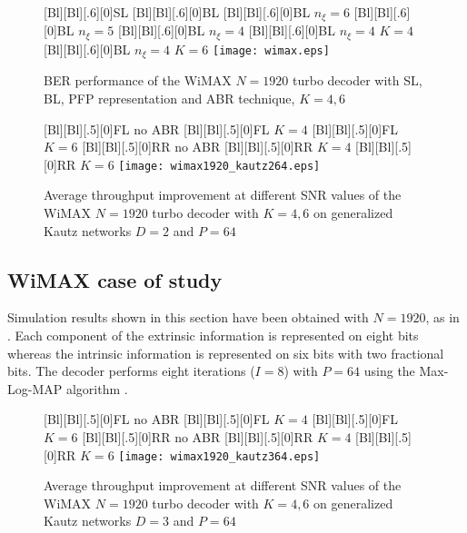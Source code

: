 \documentclass[10pt,twocolumn,journal]{IEEEtran}
\begin{document}
\begin{figure}[t!]
  \centering
  [Bl][Bl][.6][0]{SL}
  [Bl][Bl][.6][0]{BL}
  [Bl][Bl][.6][0]{BL $n_{\xi}=6$}
  [Bl][Bl][.6][0]{BL $n_{\xi}=5$}
  [Bl][Bl][.6][0]{BL $n_{\xi}=4$}
  [Bl][Bl][.6][0]{BL $n_{\xi}=4$ $K=4$}
  [Bl][Bl][.6][0]{BL $n_{\xi}=4$ $K=6$}
  \texttt{[image: wimax.eps]}
\caption{BER performance of the WiMAX $N=1920$ turbo decoder with SL, BL, PFP representation and ABR technique, $K=4, 6$} 
\label{fig:wimax}
\end{figure}
\begin{figure}[t!]
    \centering
      [Bl][Bl][.5][0]{FL no ABR}
      [Bl][Bl][.5][0]{FL $K=4$}
      [Bl][Bl][.5][0]{FL $K=6$}
      [Bl][Bl][.5][0]{RR no ABR}
      [Bl][Bl][.5][0]{RR $K=4$}
      [Bl][Bl][.5][0]{RR $K=6$}
      \texttt{[image: wimax1920\_kautz264.eps]}
\caption{Average throughput improvement at different SNR values of the WiMAX $N=1920$ turbo decoder with $K=4, 6$ 
on generalized Kautz networks $D=2$ and $P=64$}
\label{fig:ABR_wimax_1920_2}
\end{figure}

\subsection{WiMAX case of study} 

Simulation results shown in this section have been obtained with $N=1920$, as in \cite{kim_TCASII09}. 
Each component of the extrinsic information is represented on eight bits whereas the intrinsic information is 
represented on six bits with two fractional bits. The decoder performs eight iterations ($I=8$) with $P=64$ using the Max-Log-MAP 
algorithm \cite{robertson_ETT97}.
\begin{figure}[t!]
    \centering
      [Bl][Bl][.5][0]{FL no ABR}
      [Bl][Bl][.5][0]{FL $K=4$}
      [Bl][Bl][.5][0]{FL $K=6$}
      [Bl][Bl][.5][0]{RR no ABR}
      [Bl][Bl][.5][0]{RR $K=4$}
      [Bl][Bl][.5][0]{RR $K=6$}
      \texttt{[image: wimax1920\_kautz364.eps]}
\caption{Average throughput improvement at different SNR values of the WiMAX $N=1920$ turbo decoder with $K=4, 6$ 
on generalized Kautz networks $D=3$ and $P=64$}
\label{fig:ABR_wimax_1920_3}
\end{figure}
\end{document}
